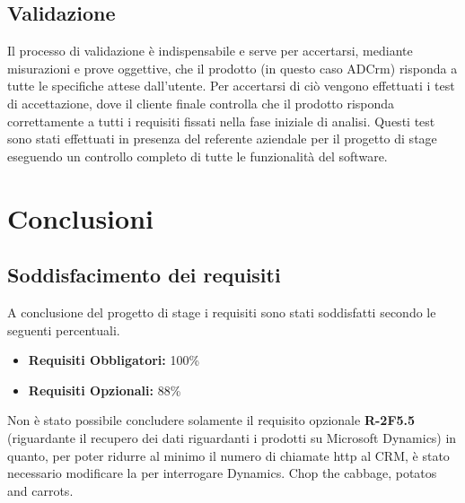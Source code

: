 \documentclass[12pt,a4paper,twoside,openany,english]{book}
\begin{document}
\section{Validazione}
Il processo di validazione è indispensabile e serve per accertarsi, mediante misurazioni e prove oggettive, che il prodotto (in questo caso ADCrm) risponda a tutte le specifiche attese dall'utente.
Per accertarsi di ciò vengono effettuati i test di accettazione, dove il cliente finale controlla che il prodotto risponda correttamente a tutti i requisiti fissati nella fase iniziale di analisi.
Questi test sono stati effettuati in presenza del referente aziendale per il progetto di stage eseguendo un controllo completo di tutte le funzionalità del software.


\chapter{Conclusioni}\label{conclusioni}
\section{Soddisfacimento dei requisiti}
A conclusione del progetto di stage i requisiti sono stati soddisfatti secondo le seguenti percentuali.
\begin{itemize}
	\item \textbf{Requisiti Obbligatori:} 100\%
	\item \textbf{Requisiti Opzionali:} 88\%
\end{itemize}
Non è stato possibile concludere solamente il requisito opzionale \textbf{R-2F5.5} (riguardante il recupero dei dati riguardanti i prodotti su Microsoft Dynamics) in quanto, per poter ridurre al minimo il numero di chiamate http al CRM, è stato necessario modificare la  per interrogare Dynamics.
Chop the \gls{cabbage}, \glspl{potato} and \glspl{carrot}.

\printnoidxglossaries

%




\end{document}
